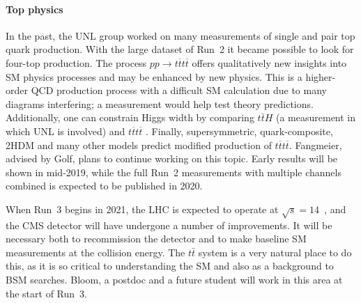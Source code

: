\paragraph{Top physics}
%

In the past, the UNL group worked on many measurements of single and pair top quark production. With the large dataset of Run~2 it became possible to look for four-top production. The process $pp\to t\overline{t}t\overline{t}$ offers qualitatively new insights into SM physics processes and may be enhanced by new physics. This is a higher-order QCD production process with a difficult SM calculation due to many diagrams interfering; a measurement would help test theory predictions. Additionally, one can constrain Higgs width by comparing $t\bar{t}H$ (a measurement in which UNL is involved) and $t\overline{t}t\overline{t}$ \cite{bib:Higgs-width-tttt}. Finally, supersymmetric, quark-composite, 2HDM and many other models predict modified production of $t\overline{t}t\overline{t}$. Fangmeier, advised by Golf, plans to continue working on this topic. Early results will be shown in mid-2019, while the full Run~2 measurements with multiple channels combined is expected to be published in 2020.

When Run~3 begins in 2021, the LHC is expected to operate at $\sqrt{s} = 14$~\TeV, and the CMS detector will have undergone a number of improvements.  It will be necessary both to recommission the detector and to make 
baseline SM measurements at the collision energy.  The $t\bar{t}$ system is a very natural place to do this, as it is so critical to understanding the SM and also as a background to BSM searches.  
%
Bloom, a postdoc and a future student will work in this area at the start of Run~3.

